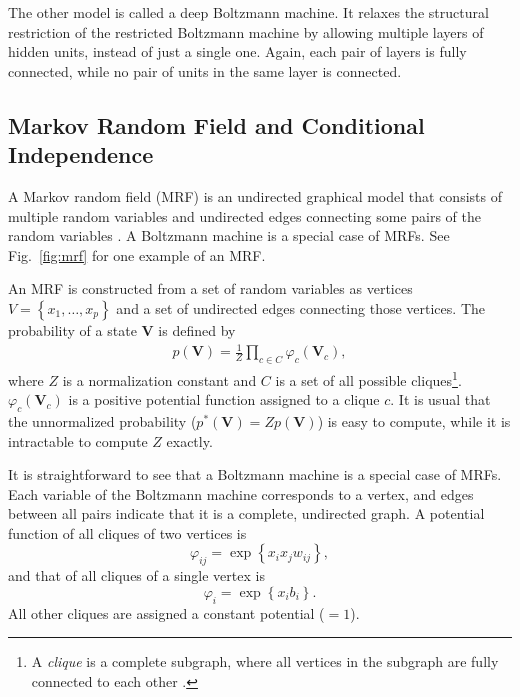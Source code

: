 \documentclass[dissertation,nocontribution,draft*]{aaltoseries}
\newcommand{\matr}[1]{\mathbf{#1}}
\newcommand{\mV}[0]{\matr{V}}
\begin{document}
The other model is called a deep Boltzmann machine. It
relaxes the structural restriction of the restricted
Boltzmann machine by allowing multiple layers of hidden
units, instead of just a single one. Again, each pair of
layers is fully connected, while no pair of units in the
same layer is connected.


\subsection{Markov Random Field and Conditional
Independence}
\label{sec:mrf}

A Markov random field (MRF) is an undirected graphical model
that consists of multiple random variables and undirected
edges connecting some pairs of the random variables
\citep[see, e.g.,][]{Kindermann1980}. A Boltzmann machine is
a special case of MRFs. See Fig.~\ref{fig:mrf} for one
example of an MRF.

An MRF is constructed from a set of random variables as
vertices $V=\left\{ x_1, \dots, x_p \right\}$ and a set of
undirected edges connecting those vertices. The probability of
a state $\mV$ is defined by 
\begin{align*}
    p(\mV) = \frac{1}{Z} \prod_{c \in C} \varphi_c
    \left(\mV_c\right),
\end{align*}
where $Z$ is a normalization constant and $C$ is a set of all
possible cliques\footnote{A \textit{clique} is a complete
subgraph, where all vertices in the subgraph are fully
connected to each other \citep[see, e.g.,][]{Bondy2008}.}.
$\varphi_c\left(\mV_c\right)$ is a positive potential
function assigned to a clique $c$. It is usual that the
unnormalized probability ($p^*(\mV) = Z p(\mV)$) is easy to
compute, while it is intractable to compute $Z$ exactly.

It is straightforward to see that a Boltzmann machine is a
special case of MRFs. Each variable of the Boltzmann machine
corresponds to a vertex, and edges between all pairs
indicate that it is a complete, undirected graph. A
potential function of all cliques of two vertices is
\[
\varphi_{ij} = \exp \left\{ x_i x_j w_{ij} \right\},
\]
and that of all cliques of a single vertex is
\[
\varphi_{i} = \exp \left\{ x_i b_i \right\}.
\]
All other cliques are assigned a constant potential ($=1$).
\end{document}
